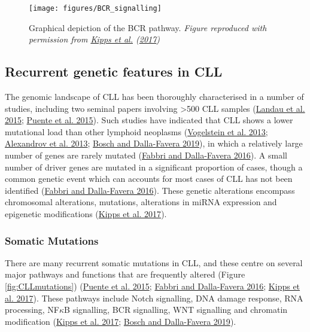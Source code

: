\documentclass[11pt, a4paper, twosided]{book}
\begin{document}
\begin{figure}

{\centering \texttt{[image: figures/BCR\_signalling]} 

}

\caption{Graphical depiction of the BCR pathway. \emph{Figure reproduced with permission from \protect\hyperlink{ref-Kipps2017}{Kipps et al.} (\protect\hyperlink{ref-Kipps2017}{2017}) }}\label{fig:BCRsignalling}
\end{figure}
\hypertarget{intro-genetic-features}{%
\subsection{Recurrent genetic features in CLL}\label{intro-genetic-features}}

The genomic landscape of CLL has been thoroughly characterised in a number of studies, including two seminal papers involving \textgreater500 CLL samples (\protect\hyperlink{ref-Landau2015}{Landau et al. 2015}; \protect\hyperlink{ref-Puente2015}{Puente et al. 2015}). Such studies have indicated that CLL shows a lower mutational load than other lymphoid neoplasms (\protect\hyperlink{ref-Vogelstein2013}{Vogelstein et al. 2013}; \protect\hyperlink{ref-Alexandrov2013}{Alexandrov et al. 2013}; \protect\hyperlink{ref-Bosch2019}{Bosch and Dalla-Favera 2019}), in which a relatively large number of genes are rarely mutated (\protect\hyperlink{ref-Fabbri2016}{Fabbri and Dalla-Favera 2016}). A small number of driver genes are mutated in a significant proportion of cases, though a common genetic event which can accounts for most cases of CLL has not been identified (\protect\hyperlink{ref-Fabbri2016}{Fabbri and Dalla-Favera 2016}). These genetic alterations encompass chromosomal alterations, mutations, alterations in miRNA expression and epigenetic modifications (\protect\hyperlink{ref-Kipps2017}{Kipps et al. 2017}).

\hypertarget{intro-mutations}{%
\subsubsection{Somatic Mutations}\label{intro-mutations}}

There are many recurrent somatic mutations in CLL, and these centre on several major pathways and functions that are frequently altered (Figure \ref{fig:CLLmutations}) (\protect\hyperlink{ref-Puente2015}{Puente et al. 2015}; \protect\hyperlink{ref-Fabbri2016}{Fabbri and Dalla-Favera 2016}; \protect\hyperlink{ref-Kipps2017}{Kipps et al. 2017}). These pathways include Notch signalling, DNA damage response, RNA processing, NF\(\kappa\)B signalling, BCR signalling, WNT signalling and chromatin modification (\protect\hyperlink{ref-Kipps2017}{Kipps et al. 2017}; \protect\hyperlink{ref-Bosch2019}{Bosch and Dalla-Favera 2019}).
\end{document}
